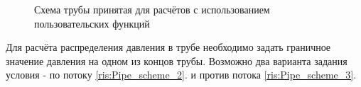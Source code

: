 \begin{figure}[h!]
\begin{center}

	\caption{Схема трубы принятая для расчётов с использованием пользовательских функций}
	\label{ris:Pipe_scheme_1}

\end{center}
\end{figure}


Для расчёта распределения давления в трубе необходимо задать граничное значение давления на одном из концов трубы. Возможно два варианта задания условия - по потоку  \ref{ris:Pipe_scheme_2}. и против потока  \ref{ris:Pipe_scheme_3}. 



